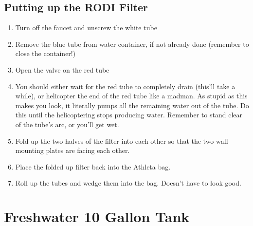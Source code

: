 \documentclass{report}
\begin{document}
\section{Putting up the RODI Filter}
\begin{enumerate}
    \item Turn off the faucet and unscrew the white tube
    \item Remove the blue tube from water container, if not already done (remember to close the container!)
    \item Open the valve on the red tube
    \item You should either wait for the red tube to completely drain (this'll take a while), or helicopter the end of the 
    red tube like a madman. As stupid as this makes you look, it literally pumps all the remaining water out of the tube. 
    Do this until the helicoptering stops producing water. Remember to stand clear of the tube's arc, or you'll get wet. 
    \item Fold up the two halves of the filter into each other so that the two wall mounting plates are facing each other. 
    \item Place the folded up filter back into the Athleta bag. 
    \item Roll up the tubes and wedge them into the bag. Doesn't have to look good.
\end{enumerate}

\newpage
\chapter{Freshwater 10 Gallon Tank}
\end{document}
